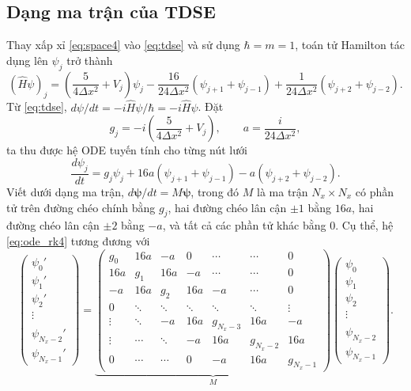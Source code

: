 \documentclass[12pt,a4paper]{article}
\begin{document}
\subsection{Dạng ma trận của TDSE}

Thay xấp xỉ \eqref{eq:space4} vào \eqref{eq:tdse} và sử dụng $\hbar=m=1$, toán tử Hamilton tác dụng lên $\psi_j$ trở thành
\begin{equation}
    (\hat H\psi)_j
    =\left(\frac{5}{4\Delta x^2}+V_j\right)\psi_j
    -\frac{16}{24\Delta x^2}\left(\psi_{j+1}+\psi_{j-1}\right)
    +\frac{1}{24\Delta x^2}\left(\psi_{j+2}+\psi_{j-2}\right).
\end{equation}
Từ \eqref{eq:tdse}, $d\psi/dt=-i\hat H\psi/\hbar=-i\hat H\psi$. Đặt
\begin{equation}
    g_j=-i\left(\frac{5}{4\Delta x^2}+V_j\right),
    \qquad
    a=\frac{i}{24\Delta x^2},
    \label{eq:ga_rk4}
\end{equation}
ta thu được hệ ODE tuyến tính cho từng nút lưới
\begin{equation}
    \boxed{
    \frac{d\psi_j}{dt}=g_j\psi_j
    +16a\left(\psi_{j+1}+\psi_{j-1}\right)
    -a\left(\psi_{j+2}+\psi_{j-2}\right).}
    \label{eq:ode_rk4}
\end{equation}
Viết dưới dạng ma trận, $d\boldsymbol\psi/dt=M\boldsymbol\psi$, trong đó $M$ là ma trận $N_x\times N_x$ có phần tử trên đường chéo chính bằng $g_j$, hai đường chéo lân cận $\pm1$ bằng $16a$, hai đường chéo lân cận $\pm2$ bằng $-a$, và tất cả các phần tử khác bằng 0. Cụ thể, hệ \eqref{eq:ode_rk4} tương đương với
\begin{equation}
\begin{pmatrix}
\psi_0'\\ \psi_1'\\ \psi_2'\\ \vdots\\ \\ \psi_{N_x-2}'\\ \psi_{N_x-1}'
\end{pmatrix}
=
\underbrace{\begin{pmatrix}
g_0  & 16a & -a   & 0      & \cdots & \cdots & 0\\
16a  & g_1 & 16a  & -a     & \cdots & \cdots & 0\\
-a   & 16a & g_2  & 16a    & -a     & \cdots & 0\\
0    & \ddots & \ddots & \ddots & \ddots & \ddots & \vdots\\
\vdots & \ddots & -a & 16a & g_{N_x-3} & 16a & -a\\
\vdots & \cdots & \ddots & -a & 16a & g_{N_x-2} & 16a\\
0    & \cdots & \cdots & 0      & -a     & 16a & g_{N_x-1}
\end{pmatrix}}_{M}
\begin{pmatrix}
\psi_0\\ \psi_1\\ \psi_2\\ \vdots\\ \\ \psi_{N_x-2}\\ \psi_{N_x-1}
\end{pmatrix}.
\label{eq:matrixM}
\end{equation}
\end{document}
